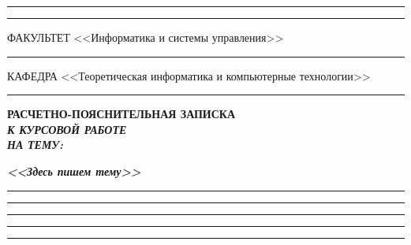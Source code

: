 \documentclass[14pt, russian]{scrartcl}
\begin{document}
\begin{titlepage}
\vspace{-2pt}
\hspace{-34.5pt}\rule{\textwidth}{2.5pt}

\vspace*{-20.3pt}
\hspace{-34.5pt}\rule{\textwidth}{0.4pt}
 
\vspace{0.5ex}
\noindent \small ФАКУЛЬТЕТ\hspace{80pt} <<Информатика и системы управления>>

\vspace*{-16pt}
\hspace{35pt}\rule{0.855\textwidth}{0.4pt}

\vspace{0.5ex}
\noindent \small КАФЕДРА\hspace{50pt} <<Теоретическая информатика и компьютерные технологии>>

\vspace*{-16pt}
\hspace{25pt}\rule{0.875\textwidth}{0.4pt}
 
 
\vspace{3em}
 
\begin{center}
\Large \bf{РАСЧЕТНО-ПОЯСНИТЕЛЬНАЯ ЗАПИСКА\\\textbf{\textit{К КУРСОВОЙ РАБОТЕ\\НА ТЕМУ:}} \\}
\end{center}

\vspace*{-6ex} 
\begin{center}
\Large{\textit{\textbf{<<Здесь пишем тему>>}}}

\vspace*{-3ex}
\rule{0.9\textwidth}{1.2pt}

\vspace*{-0.2ex}
\rule{0.9\textwidth}{1.2pt}

\vspace*{-0.2ex}
\rule{0.9\textwidth}{1.2pt}

\vspace*{-0.2ex}
\rule{0.9\textwidth}{1.2pt}

\vspace*{-0.2ex}
\rule{0.9\textwidth}{1.2pt}
\end{center}
 
\vspace{\fill}
 

\newlength{\ML}


\end{titlepage}
\end{document}
